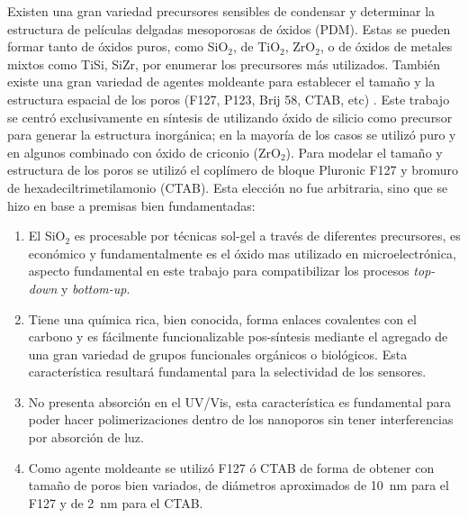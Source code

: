 	Existen una gran variedad precursores sensibles de condensar y determinar la estructura de películas delgadas mesoporosas de óxidos (PDM). Estas se pueden formar tanto de óxidos puros, como SiO$_2$, de TiO$_2$, ZrO$_2$, o de óxidos de metales mixtos como TiSi, SiZr, por enumerar los precursores más utilizados. También existe una gran variedad de agentes moldeante para establecer el tamaño y la estructura espacial de los poros (F127, P123, Brij 58, CTAB, etc) \cite{angelome2011,schuth2013,Soler-Illia2006,Soler-Illia2002a}. Este trabajo se centró exclusivamente en síntesis de \pdm\space utilizando óxido de silicio como precursor para generar la estructura inorgánica; en la mayoría de los casos se utilizó puro y en algunos combinado con óxido de criconio (ZrO$_2$). Para modelar el tamaño y estructura de los poros se utilizó el coplímero de bloque Pluronic F127 y bromuro de hexadeciltrimetilamonio (CTAB). Esta elección no fue arbitraria, sino que se hizo en base a premisas bien fundamentadas:
		
		\begin{enumerate}

		\item El SiO$_2$ es procesable por técnicas sol-gel a través de diferentes precursores, es económico y fundamentalmente es el óxido mas utilizado en microelectrónica, aspecto fundamental en este trabajo para compatibilizar los procesos \textit{top-down} y \textit{bottom-up}.

		\item Tiene una química rica, bien conocida, forma enlaces covalentes con el carbono y es fácilmente funcionalizable pos-síntesis mediante el agregado de una gran variedad de grupos funcionales orgánicos o biológicos. Esta característica resultará fundamental para la selectividad de los sensores.

		\item No presenta absorción en el UV/Vis, esta característica es fundamental para poder hacer polimerizaciones dentro de los nanoporos sin tener interferencias por absorción de luz.

		\item Como agente moldeante se utilizó F127 ó CTAB de forma de obtener \pdm\space con tamaño de poros bien variados, de diámetros aproximados de \SI{10}{\nm} para el F127 y de \SI{2}{\nm} para el CTAB.

		\end{enumerate}
	
